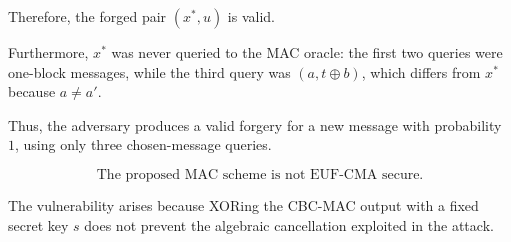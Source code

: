 \begin{loigiai}
Therefore, the forged pair $(x^*,u)$ is valid.

Furthermore, $x^*$ was never queried to the MAC oracle:
the first two queries were one-block messages, while the
third query was $(a,t\oplus b)$, which differs from $x^*$
because $a\neq a'$.

Thus, the adversary produces a valid forgery for a new
message with probability $1$, using only three
chosen-message queries.

\[
\boxed{\text{The proposed MAC scheme is not EUF-CMA secure.}}
\]

The vulnerability arises because XORing the CBC-MAC output
with a fixed secret key $s$ does not prevent the algebraic
cancellation exploited in the attack.
\end{loigiai}
